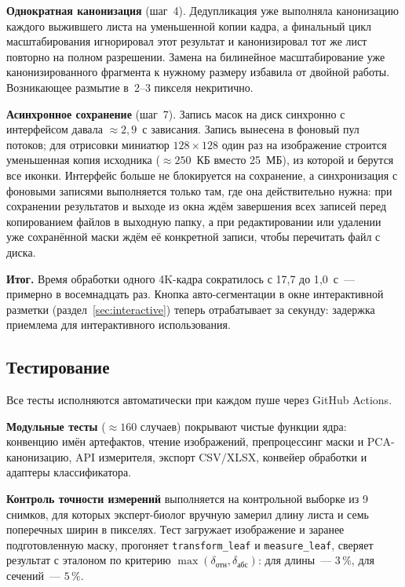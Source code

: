 \textbf{Однократная канонизация} (шаг~4). Дедупликация уже выполняла
канонизацию каждого выжившего листа на уменьшенной копии кадра, а финальный
цикл масштабирования игнорировал этот результат и канонизировал тот же лист
повторно на полном разрешении. Замена на билинейное масштабирование уже
канонизированного фрагмента к нужному размеру избавила от двойной работы.
Возникающее размытие в~2--3 пикселя некритично.

\textbf{Асинхронное сохранение} (шаг~7). Запись масок на диск синхронно с
интерфейсом давала $\approx 2{,}9$~с зависания. Запись вынесена в фоновый пул
потоков; для отрисовки миниатюр $128 \times 128$ один раз на изображение
строится уменьшенная копия исходника ($\approx 250$~КБ вместо 25~МБ), из которой
и берутся все иконки. Интерфейс больше не блокируется на сохранение, а
синхронизация с фоновыми записями выполняется только там, где она действительно
нужна: при сохранении результатов и выходе из окна ждём завершения всех записей
перед копированием файлов в выходную папку, а при редактировании или удалении
уже сохранённой маски ждём её конкретной записи, чтобы перечитать файл с диска.

\textbf{Итог.} Время обработки одного 4K-кадра сократилось с 17{,}7 до
1{,}0~с~--- примерно в восемнадцать раз. Кнопка авто-сегментации в окне
интерактивной разметки (раздел~\ref{sec:interactive}) теперь отрабатывает за
секунду: задержка приемлема для интерактивного использования.

\subsection{Тестирование}
\label{sec:testing}

Все тесты исполняются автоматически
при каждом пуше через GitHub Actions.

\textbf{Модульные тесты} ($\approx 160$ случаев) покрывают чистые функции
ядра: конвенцию имён артефактов, чтение изображений,
препроцессинг маски и PCA-канонизацию, API измерителя, экспорт CSV/XLSX,
конвейер обработки и адаптеры классификатора.

\textbf{Контроль точности измерений} выполняется на
контрольной выборке из 9 снимков, для которых эксперт-биолог вручную
замерил длину листа и семь поперечных ширин в пикселях. Тест загружает
изображение и заранее подготовленную маску, прогоняет
\texttt{transform\_leaf} и \texttt{measure\_leaf}, сверяет результат
с эталоном по критерию $\max(\delta_{\text{отн}}, \delta_{\text{абс}})$:
для длины~--- $3\,\%$, для сечений~--- $5\,\%$.

